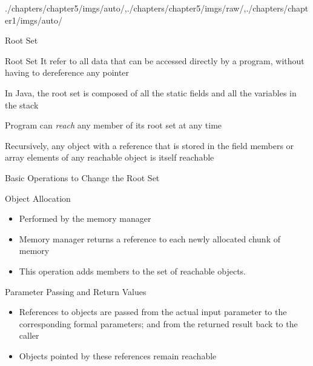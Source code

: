 \begin{graphicspathcontext}{{./chapters/chapter5/imgs/auto/},{./chapters/chapter5/imgs/raw/},{./chapters/chapter1/imgs/auto/}}
\begin{bibunit}[apalike]
\begin{frame}{Root Set}
	\begin{definitionblock}{Root Set}
		It refer to all data that can be accessed directly by a program, without having to dereference any pointer
	\end{definitionblock}
	\vspace{.25cm}
	\begin{example}
		In Java, the root set is composed of all the static fields and all the variables in the stack
	\end{example}
	\vspace{.25cm}
	\begin{description}
		\item Program can \emph{reach} any member of its root set at any time
		\item Recursively, any object with a reference that is stored in the field members or array elements of any reachable object is itself reachable
	\end{description}
	\vspace{.25cm}
\end{frame}

\begin{frame}{{Basic Operations} to Change the Root Set}
	\begin{block}{Object Allocation}
		\begin{itemize}
			\item Performed by the memory manager
			\item Memory manager returns a reference to each newly allocated chunk of memory
			\item This operation adds members to the set of reachable objects.
		\end{itemize}
	\end{block}
	\vspace{.5cm}
	\begin{block}{Parameter Passing and Return Values}
		\begin{itemize}
			\item References to objects are passed from the actual input parameter to the corresponding formal parameters; and from the returned result back to the caller
			\item Objects pointed by these references remain reachable
		\end{itemize}
	\end{block}
\end{frame}


\end{bibunit}
\end{graphicspathcontext}
